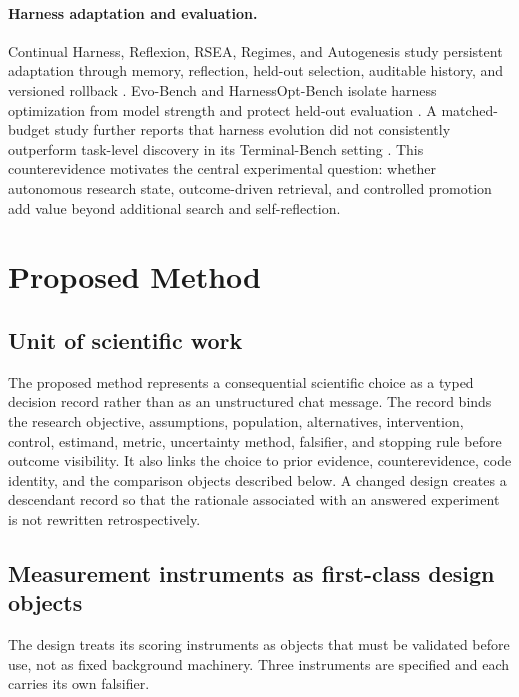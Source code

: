 \documentclass[11pt,a4paper]{article}
\begin{document}
\paragraph{Harness adaptation and evaluation.}
Continual Harness, Reflexion, RSEA, Regimes, and Autogenesis study persistent
adaptation through memory, reflection, held-out selection, auditable history,
and versioned rollback \citep{continual2026,reflexion2023,rsea2026,
regimes2026,autogenesis2026}.  Evo-Bench and HarnessOpt-Bench isolate harness
optimization from model strength and protect held-out evaluation
\citep{evobench2026,harnessopt2026}.  A matched-budget study further reports
that harness evolution did not consistently outperform task-level discovery in
its Terminal-Bench setting \citep{rethinkingharness2026}.  This counterevidence
motivates the central experimental question: whether autonomous research
state, outcome-driven retrieval, and controlled promotion add value beyond
additional search and self-reflection.

\section{Proposed Method}

\subsection{Unit of scientific work}

The proposed method represents a consequential scientific choice as a typed decision record rather
than as an unstructured chat message.  The record binds the research objective,
assumptions, population, alternatives, intervention, control, estimand, metric,
uncertainty method, falsifier, and stopping rule before outcome visibility.  It
also links the choice to prior evidence, counterevidence, code identity, and the
comparison objects described below.  A changed design creates a descendant
record so that the rationale associated with an answered experiment is not
rewritten retrospectively.

\subsection{Measurement instruments as first-class design objects}

The design treats its scoring instruments as objects that must be validated
before use, not as fixed background machinery.  Three instruments are specified
and each carries its own falsifier.
\end{document}
